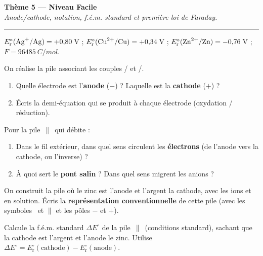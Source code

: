 \documentclass[11pt,a4paper]{article}
\newcommand{\Ered}{\ensuremath{E_{\mathrm{r}}^{\circ}}}
\newcommand{\fem}{\ensuremath{\Delta E}}
\newcounter{exo}
\begin{document}
\begin{center}
{\LARGE\bfseries\color{primarydark}Thème 5 — Niveau Facile}\\[2pt]
{\small\itshape Anode/cathode, notation, f.é.m. standard et première loi de Faraday.}\\[-4pt]
{\color{primary}\rule{\textwidth}{1pt}}
\end{center}

\begin{donnees}
\centering\small
$\Ered(\ce{Ag+}/\ce{Ag})=+0{,}80$\,V ; \quad $\Ered(\ce{Cu^{2+}}/\ce{Cu})=+0{,}34$\,V ; \quad
$\Ered(\ce{Zn^{2+}}/\ce{Zn})=-0{,}76$\,V ; \quad $F=\SI{96485}{C\per mol}$.
\end{donnees}

\begin{exo}
On réalise la pile associant les couples / et /.
\begin{enumerate}[label=(\alph*),leftmargin=2em,topsep=1pt,itemsep=1pt]
  \item Quelle électrode est l'\textbf{anode} ($-$) ? Laquelle est la \textbf{cathode} ($+$) ?
  \item Écris la demi-équation qui se produit à chaque électrode (oxydation / réduction).
\end{enumerate}
\end{exo}

\begin{exo}
Pour la pile $\,\|\,$ qui débite :
\begin{enumerate}[label=(\alph*),leftmargin=2em,topsep=1pt,itemsep=1pt]
  \item Dans le fil extérieur, dans quel sens circulent les \textbf{électrons} (de l'anode vers la
        cathode, ou l'inverse) ?
  \item À quoi sert le \textbf{pont salin} ? Dans quel sens migrent les anions ?
\end{enumerate}
\end{exo}

\begin{exo}
On construit la pile où le zinc est l'anode et l'argent la cathode, avec les ions  et
 en solution. Écris la \textbf{représentation conventionnelle} de cette pile (avec les
symboles \textbar\ et $\|$ et les pôles $-$ et $+$).
\end{exo}

\begin{exo}
Calcule la f.é.m. standard $\fem^{\circ}$ de la pile $\,\|\,$ (conditions standard),
sachant que la cathode est l'argent et l'anode le zinc. Utilise
$\fem^{\circ}=\Ered(\text{cathode})-\Ered(\text{anode})$.
\end{exo}
\end{document}
